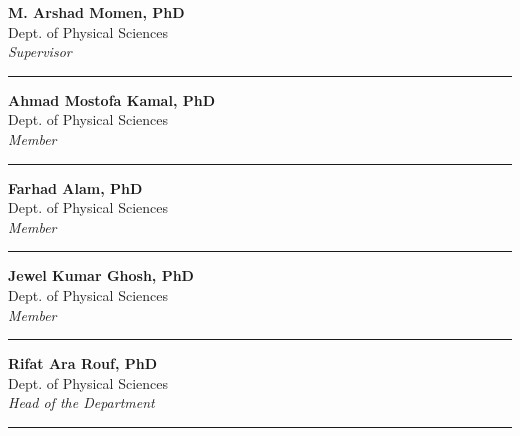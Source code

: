 \documentclass[12pt,oneside,openright]{report}
\theoremstyle{definition}
\theoremstyle{plain}
\theoremstyle{remark}
\begin{document}
\vspace{0.5cm}

\noindent\begin{minipage}[t]{0.62\textwidth}
\textbf{M. Arshad Momen, PhD}\\
Dept. of Physical Sciences\\
\textit{Supervisor}
\end{minipage}\hfill
\begin{minipage}[t]{0.34\textwidth}
\rule{\linewidth}{0.4pt}
\end{minipage}

\vspace{0.6cm}

\noindent\begin{minipage}[t]{0.62\textwidth}
\textbf{Ahmad Mostofa Kamal, PhD}\\
Dept. of Physical Sciences\\
\textit{Member}
\end{minipage}\hfill
\begin{minipage}[t]{0.34\textwidth}
\rule{\linewidth}{0.4pt}
\end{minipage}

\vspace{0.6cm}

\noindent\begin{minipage}[t]{0.62\textwidth}
\textbf{Farhad Alam, PhD}\\
Dept. of Physical Sciences\\
\textit{Member}
\end{minipage}\hfill
\begin{minipage}[t]{0.34\textwidth}
\rule{\linewidth}{0.4pt}
\end{minipage}

\vspace{0.6cm}

\noindent\begin{minipage}[t]{0.62\textwidth}
\textbf{Jewel Kumar Ghosh, PhD}\\
Dept. of Physical Sciences\\
\textit{Member}
\end{minipage}\hfill
\begin{minipage}[t]{0.34\textwidth}
\rule{\linewidth}{0.4pt}
\end{minipage}

\vspace{0.6cm}

\noindent\begin{minipage}[t]{0.62\textwidth}
\textbf{Rifat Ara Rouf, PhD}\\
Dept. of Physical Sciences\\
\textit{Head of the Department}
\end{minipage}\hfill
\begin{minipage}[t]{0.34\textwidth}
\rule{\linewidth}{0.4pt}
\end{minipage}
\end{document}
